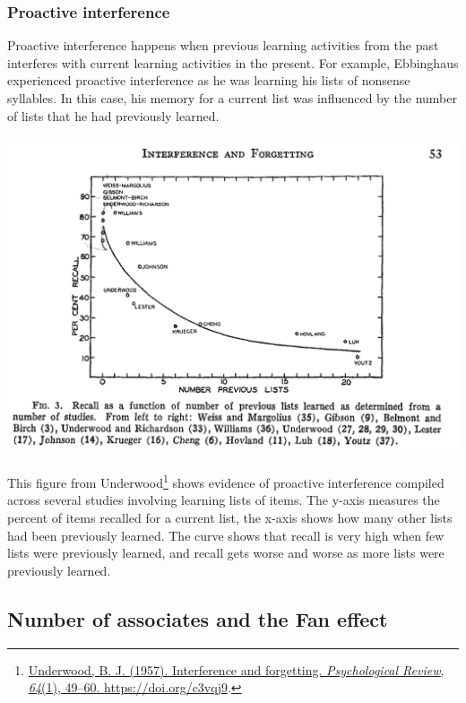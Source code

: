 \documentclass[
  oneside,
  12pt]{crumpbook}
\newenvironment{floatright50}{%
  \wrapfigure{R}{.5\textwidth}%
  }{%
  \endwrapfigure}
\begin{document}
\hypertarget{proactive-interference}{%
\subsubsection{Proactive interference}\label{proactive-interference}}

Proactive interference happens when previous learning activities from the past interferes with current learning activities in the present. For example, Ebbinghaus experienced proactive interference as he was learning his lists of nonsense syllables. In this case, his memory for a current list was influenced by the number of lists that he had previously learned.

\begin{floatright50}
\includegraphics[width=1\linewidth]{imgs/Underwood_1957}

\end{floatright50}

This figure from Underwood\footnote{\protect\hyperlink{ref-underwoodInterferenceForgetting1957}{Underwood, B. J. (1957). Interference and forgetting. \emph{Psychological Review}, \emph{64}(1), 49--60. \url{https://doi.org/c3vqj9}}.} shows evidence of proactive interference compiled across several studies involving learning lists of items. The y-axis measures the percent of items recalled for a current list, the x-axis shows how many other lists had been previously learned. The curve shows that recall is very high when few lists were previously learned, and recall gets worse and worse as more lists were previously learned.

\hypertarget{number-of-associates-and-the-fan-effect}{%
\subsection{Number of associates and the Fan effect}\label{number-of-associates-and-the-fan-effect}}
\end{document}
